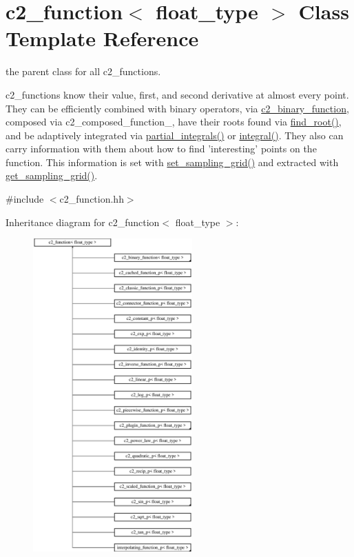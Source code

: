 \hypertarget{classc2__function}{\section{c2\-\_\-function$<$ float\-\_\-type $>$ Class Template Reference}
\label{classc2__function}
}


the parent class for all c2\-\_\-functions.

c2\-\_\-functions know their value, first, and second derivative at almost every point. They can be efficiently combined with binary operators, via \hyperlink{classc2__binary__function}{c2\-\_\-binary\-\_\-function}, composed via c2\-\_\-composed\-\_\-function\-\_\-, have their roots found via \hyperlink{classc2__function_acd17a7191226578c866d82cb2e9ff89f}{find\-\_\-root()}, and be adaptively integrated via \hyperlink{classc2__function_a89ce5e2f44ebfaf9eb4d66605cde4fde}{partial\-\_\-integrals()} or \hyperlink{classc2__function_a675c5056562332be2e49b38485d322b7}{integral()}. They also can carry information with them about how to find 'interesting' points on the function. This information is set with \hyperlink{classc2__function_a23828c75121b442899ab7a80cf5abbb0}{set\-\_\-sampling\-\_\-grid()} and extracted with \hyperlink{classc2__function_ad03264dcc015e5d0b1b6eb30df3f32be}{get\-\_\-sampling\-\_\-grid()}.  




{\ttfamily \#include $<$c2\-\_\-function.\-hh$>$}

Inheritance diagram for c2\-\_\-function$<$ float\-\_\-type $>$\-:\begin{figure}[H]
\begin{center}
\leavevmode
\includegraphics[height=12.000000cm]{classc2__function}
\end{center}
\end{figure}
